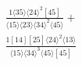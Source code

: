 \documentclass[varwidth, border=5pt]{standalone}
\begin{document}
\begin{my}
$\begin{gathered}
\scriptscriptstyle\frac{1⟨35⟩⟨24⟩^2[45]}{⟨15⟩⟨23⟩⟨34⟩^2⟨45⟩}+\\
\scriptscriptstyle\frac{1[14][25]⟨24⟩^2⟨13⟩}{⟨15⟩⟨34⟩^3⟨45⟩[45]}\phantom{+}
\end{gathered}$
\end{my}
\end{document}
